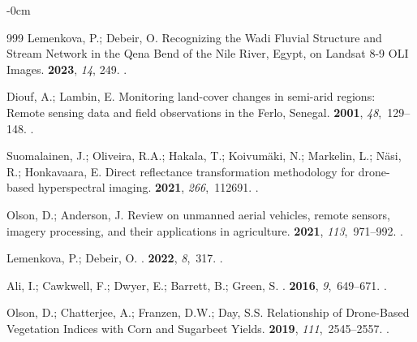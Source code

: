 \documentclass[earth,article,accept,pdftex,moreauthors]{Definitions/mdpi}
\begin{document}
{\begin{adjustwidth}{-\extralength}{0cm}
\begin{thebibliography}{999}
Lemenkova, P.; Debeir, O.
\newblock Recognizing the Wadi Fluvial Structure and Stream Network in the Qena
  Bend of the Nile River, Egypt, on Landsat 8-9 OLI Images.
 {\bf 2023}, {\em 14}, 249.
.

Diouf, A.; Lambin, E.
\newblock Monitoring land-cover changes in semi-arid regions: Remote sensing
  data and field observations in the Ferlo, Senegal.
 {\bf 2001}, {\em 48},~129--148.
.

Suomalainen, J.; Oliveira, R.A.; Hakala, T.; Koivumäki, N.; Markelin, L.;
  Näsi, R.; Honkavaara, E.
\newblock Direct reflectance transformation methodology for drone-based
  hyperspectral imaging.
 {\bf 2021}, {\em 266},~112691.
.

Olson, D.; Anderson, J.
\newblock Review on unmanned aerial vehicles, remote sensors, imagery
  processing, and their applications in agriculture.
 {\bf 2021}, {\em 113},~971--992.
.

Lemenkova, P.; Debeir, O.
.
 {\bf 2022}, {\em 8},~317.
.

Ali, I.; Cawkwell, F.; Dwyer, E.; Barrett, B.; Green, S.
.
 {\bf 2016}, {\em 9},~649--671.
.

Olson, D.; Chatterjee, A.; Franzen, D.W.; Day, S.S.
\newblock Relationship of Drone-Based Vegetation Indices with Corn and
  Sugarbeet Yields.
 {\bf 2019}, {\em 111},~2545--2557.
.


\end{thebibliography}
\end{adjustwidth}}
\end{document}
